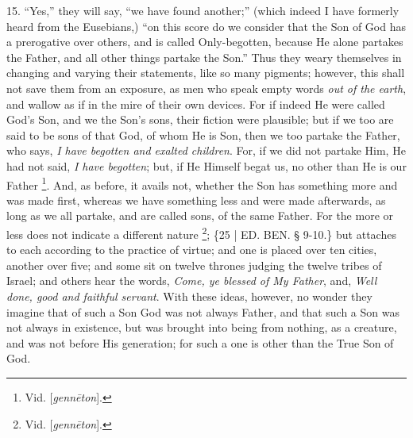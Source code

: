 15. ``Yes,'' they will say, ``we
have found another;'' (which indeed I have formerly heard from the
Eusebians,) ``on this score do we consider that the Son of God has a
prerogative over others, and is called Only-begotten, because He alone
partakes the Father, and all other things partake the Son.'' Thus they
weary themselves in changing and varying their statements, like so
many pigments; however, this shall not save them from an exposure, as
men who speak empty words \emph{out of the earth}, and wallow as if in
the mire of their own devices. For if indeed He were called God's Son,
and we the Son's sons, their fiction were plausible; but if we too are
said to be sons of that God, of whom He is Son, then we too partake
the Father, who says, \emph{I have begotten and exalted children}.
For, if we did not partake Him, He had not said, \emph{I have begotten};
but, if He Himself begat us, no other than He is our Father \footnote{Vid. [\emph{genn\={e}ton}].}. And, as before, it avails not, whether the Son has something
more and was made first, whereas we have something less and were made
afterwards, as long as we all partake, and are called sons, of the
same Father. For the more or less does not indicate a different nature
\footnote{Vid. [\emph{genn\={e}ton}].}; \{25 | ED. BEN. § 9-10.\} but
attaches to each according to the practice of virtue; and one is
placed over ten cities, another over five; and some sit on twelve
thrones judging the twelve tribes of Israel; and others hear the
words, \emph{Come, ye blessed of My Father}, and, \emph{Well done, good
and faithful servant}. With these ideas, however, no wonder they
imagine that of such a Son God was not always Father, and that such a
Son was not always in existence, but was brought into being from
nothing, as a creature, and was not before His generation; for such a
one is other than the True Son of God.

